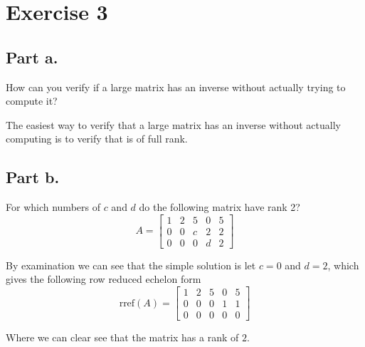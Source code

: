 \section{Exercise 3}
\subsection{Part a.}
How can you verify if a large matrix has an inverse without actually trying
to compute it?
\begin{mdframed}[style=MyFrame]
    The easiest way to verify that a large matrix has an inverse without
    actually computing is to verify that is of full rank.
\end{mdframed}
\subsection{Part b.}
For which numbers of $c$ and $d$ do the following matrix have rank 2?
\begin{equation}
    A =
    \begin{bmatrix}
        1   &   2   &   5   &   0   &   5   \\
        0   &   0   &   c   &   2   &   2   \\
        0   &   0   &   0   &   d   &   2
    \end{bmatrix}
\end{equation}

\begin{mdframed}[style=MyFrame]
    By examination we can see that the simple solution is let $c=0$ and
    $d=2$, which gives the following row reduced echelon form
    \begin{equation}
        \text{rref}(A) =
        \begin{bmatrix}
            1   &   2   &   5   &   0   &   5   \\
            0   &   0   &   0   &   1   &   1   \\
            0   &   0   &   0   &   0   &   0
        \end{bmatrix}
    \end{equation}
    
    Where we can clear see that the matrix has a rank of $2$.
\end{mdframed}

